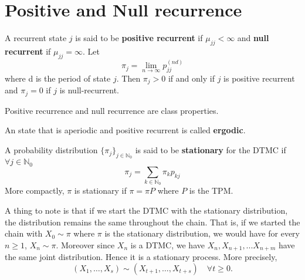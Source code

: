 \documentclass[a4paper,10pt]{article}
\begin{document}
\section{Positive and Null recurrence}
A recurrent state $j$ is said to be \textbf{positive recurrent} if $\mu_{jj} < \infty$ and \textbf{null recurrent} if $\mu_{jj} = \infty$. Let
\[\pi_j = \lim_{n \to \infty} p_{jj}^{(nd)}\]
where d is the period of state $j$. Then $\pi_j > 0$ if and only if $j$ is positive recurrent and $\pi_j = 0$ if  $j$ is null-recurrent. 

\begin{prop}
Positive recurrence and null recurrence are class properties.
\end{prop}
\begin{defn}
An state that is aperiodic and positive recurrent is called \textbf{ergodic}.
\end{defn}

\begin{defn}
  A probability distribution $\{\pi_j\}_{j \in \mathbb{N}_0}$ is said to
  be \textbf{stationary} for the DTMC if $\forall j \in \mathbb{N}_0$
\[\pi_j = \sum_{k \in \mathbb{N}_0} \pi_k p_{kj}\]
More compactly, $\pi$ is stationary if $\pi = \pi P$ where $P$ is the TPM.
\end{defn}

A thing to note is that if we start the DTMC with the stationary distribution, the distribution remains the same throughout the chain. That is, if we started the chain with $X_0 \sim \pi$ where $\pi$ is the stationary distribution, we would have for every $n \geq 1$, $X_n \sim \pi$. Moreover since $X_n$ is a DTMC, we have $X_n, X_{n+1}, ... X_{n+m}$ have the same joint distribution. Hence it is a stationary process. More precisely,
\[(X_1,\ldots,X_s)\sim(X_{t+1},\ldots,X_{t+s}) \quad \forall t \geq 0.\]
\end{document}
